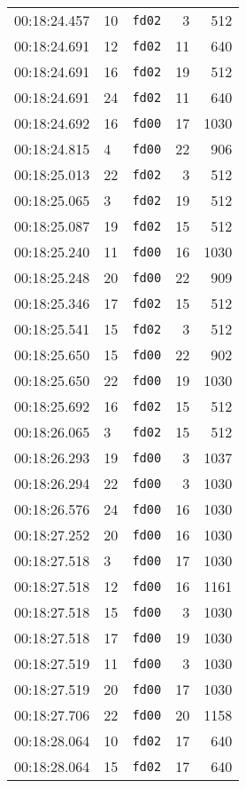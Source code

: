 \documentclass{article}
\begin{document}
\begin{longtable}{lllrr}
00:18:24.457 & 10 & \texttt{fd02} & 3 & 512 \\
00:18:24.691 & 12 & \texttt{fd02} & 11 & 640 \\
00:18:24.691 & 16 & \texttt{fd02} & 19 & 512 \\
00:18:24.691 & 24 & \texttt{fd02} & 11 & 640 \\
00:18:24.692 & 16 & \texttt{fd00} & 17 & 1030 \\
00:18:24.815 & 4 & \texttt{fd00} & 22 & 906 \\
00:18:25.013 & 22 & \texttt{fd02} & 3 & 512 \\
00:18:25.065 & 3 & \texttt{fd02} & 19 & 512 \\
00:18:25.087 & 19 & \texttt{fd02} & 15 & 512 \\
00:18:25.240 & 11 & \texttt{fd00} & 16 & 1030 \\
00:18:25.248 & 20 & \texttt{fd00} & 22 & 909 \\
00:18:25.346 & 17 & \texttt{fd02} & 15 & 512 \\
00:18:25.541 & 15 & \texttt{fd02} & 3 & 512 \\
00:18:25.650 & 15 & \texttt{fd00} & 22 & 902 \\
00:18:25.650 & 22 & \texttt{fd00} & 19 & 1030 \\
00:18:25.692 & 16 & \texttt{fd02} & 15 & 512 \\
00:18:26.065 & 3 & \texttt{fd02} & 15 & 512 \\
00:18:26.293 & 19 & \texttt{fd00} & 3 & 1037 \\
00:18:26.294 & 22 & \texttt{fd00} & 3 & 1030 \\
00:18:26.576 & 24 & \texttt{fd00} & 16 & 1030 \\
00:18:27.252 & 20 & \texttt{fd00} & 16 & 1030 \\
00:18:27.518 & 3 & \texttt{fd00} & 17 & 1030 \\
00:18:27.518 & 12 & \texttt{fd00} & 16 & 1161 \\
00:18:27.518 & 15 & \texttt{fd00} & 3 & 1030 \\
00:18:27.518 & 17 & \texttt{fd00} & 19 & 1030 \\
00:18:27.519 & 11 & \texttt{fd00} & 3 & 1030 \\
00:18:27.519 & 20 & \texttt{fd00} & 17 & 1030 \\
00:18:27.706 & 22 & \texttt{fd00} & 20 & 1158 \\
00:18:28.064 & 10 & \texttt{fd02} & 17 & 640 \\
00:18:28.064 & 15 & \texttt{fd02} & 17 & 640 \\

\end{longtable}
\end{document}
